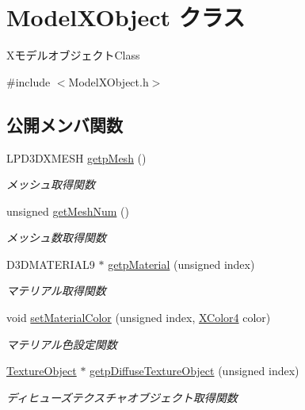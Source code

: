\hypertarget{class_model_x_object}{}\section{Model\+X\+Object クラス}
\label{class_model_x_object}


Xモデルオブジェクト\+Class  




{\ttfamily \#include $<$Model\+X\+Object.\+h$>$}

\subsection*{公開メンバ関数}
\begin{DoxyCompactItemize}
\item 
L\+P\+D3\+D\+X\+M\+E\+SH \mbox{\hyperlink{class_model_x_object_af40b9567dda03049daf9f299b33ba5a0}{getp\+Mesh}} ()
\begin{DoxyCompactList}\small\item\em メッシュ取得関数 \end{DoxyCompactList}\item 
unsigned \mbox{\hyperlink{class_model_x_object_a894790eda90cf0cc202b86f854583fda}{get\+Mesh\+Num}} ()
\begin{DoxyCompactList}\small\item\em メッシュ数取得関数 \end{DoxyCompactList}\item 
D3\+D\+M\+A\+T\+E\+R\+I\+A\+L9 $\ast$ \mbox{\hyperlink{class_model_x_object_a02fd2eb65e848f354c92f7640c18a93c}{getp\+Material}} (unsigned index)
\begin{DoxyCompactList}\small\item\em マテリアル取得関数 \end{DoxyCompactList}\item 
void \mbox{\hyperlink{class_model_x_object_ad2ab1249e44993543e1a847591d1ff16}{set\+Material\+Color}} (unsigned index, \mbox{\hyperlink{_vector3_d_8h_a680c30c4a07d86fe763c7e01169cd6cc}{X\+Color4}} color)
\begin{DoxyCompactList}\small\item\em マテリアル色設定関数 \end{DoxyCompactList}\item 
\mbox{\hyperlink{class_texture_object}{Texture\+Object}} $\ast$ \mbox{\hyperlink{class_model_x_object_a6398eb50785789e5145803fd4981bc2c}{getp\+Diffuse\+Texture\+Object}} (unsigned index)
\begin{DoxyCompactList}\small\item\em ディヒューズテクスチャオブジェクト取得関数 \end{DoxyCompactList}\item 

\end{DoxyCompactItemize}
